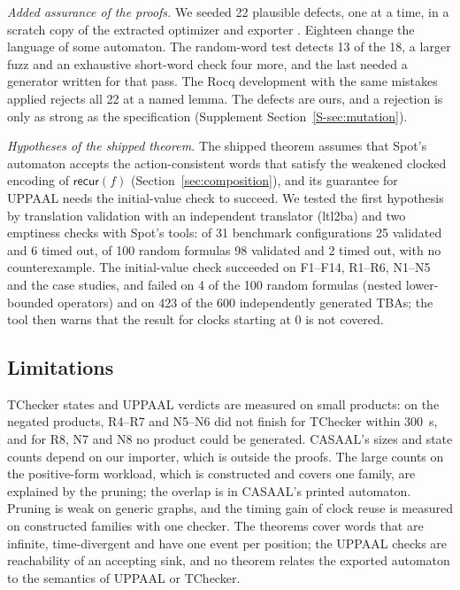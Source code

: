 \emph{Added assurance of the proofs.} We seeded 22 plausible defects, one at a time, in a scratch copy of the extracted optimizer and exporter . Eighteen change the language of some automaton. The random-word test detects 13 of the 18, a larger fuzz and an exhaustive short-word check four more, and the last needed a generator written for that pass. The Rocq development with the same mistakes applied rejects all 22 at a named lemma.  The defects are ours, and a rejection is only as strong as the specification (Supplement Section~\ref{S-sec:mutation}).

\emph{Hypotheses of the shipped theorem.} The shipped theorem assumes that Spot's automaton accepts the action-consistent words that satisfy the weakened clocked encoding of $\mathsf{recur}(f)$ (Section~\ref{sec:composition}), and its guarantee for UPPAAL needs the initial-value check to succeed. We tested the first hypothesis by translation validation with an independent translator (ltl2ba) and two emptiness checks with Spot's tools: of 31 benchmark configurations 25 validated and 6 timed out, of 100 random formulas 98 validated and 2 timed out, with no counterexample.   The initial-value check succeeded on F1--F14, R1--R6, N1--N5 and the case studies, and failed on 4 of the 100 random formulas (nested lower-bounded operators) and on 423 of the 600 independently generated TBAs; the tool then warns that the result for clocks starting at 0 is not covered.
\subsection{Limitations}
TChecker states and UPPAAL verdicts are measured on small products: on the negated products, R4--R7 and N5--N6 did not finish for TChecker within 300~s, and for R8, N7 and N8 no product could be generated. CASAAL's sizes and state counts depend on our importer, which is outside the proofs. The large counts on the positive-form workload, which is constructed and covers one family, are explained by the pruning; the overlap is in CASAAL's printed automaton. Pruning is weak on generic graphs, and the timing gain of clock reuse is measured on constructed families with one checker. The theorems cover words that are infinite, time-divergent and have one event per position; the UPPAAL checks are reachability of an accepting sink, and no theorem relates the exported automaton to the semantics of UPPAAL or TChecker.